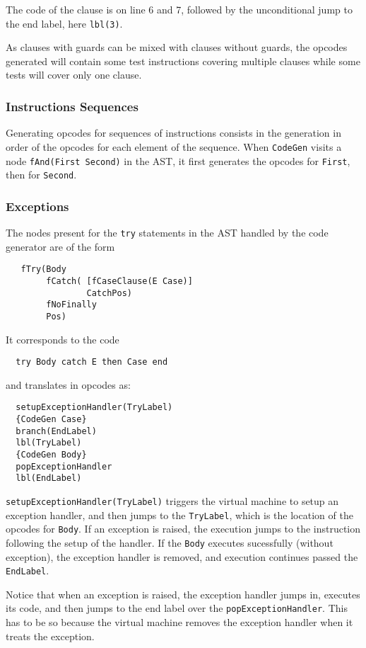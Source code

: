 \documentclass[a4paper]{memoir}
\begin{document}
The code of the clause is on line 6 and 7, followed by the unconditional jump to
the end label, here \lstinline!lbl(3)!.

As clauses with guards can be mixed with clauses without guards, the opcodes
generated will contain some test instructions covering multiple clauses while
some tests will cover only one clause.

\subsubsection{Instructions Sequences}
Generating opcodes for sequences of instructions consists in the generation in order of the opcodes for each element of the sequence. 
When \lstinline!CodeGen! visits a node \lstinline!fAnd(First Second)! in the AST, it first generates the opcodes for \lstinline!First!, then for \lstinline!Second!.


\subsubsection{Exceptions}\label{sec:arch:codegen:exceptions}
The nodes present for the \lstinline!try! statements in the AST handled by the
code generator are of the form
\begin{lstlisting}
   fTry(Body 
        fCatch( [fCaseClause(E Case)] 
                CatchPos) 
        fNoFinally 
        Pos)
\end{lstlisting}
It corresponds to the code
\begin{lstlisting}
  try Body catch E then Case end
\end{lstlisting}
and translates in opcodes as:
\begin{lstlisting}
  setupExceptionHandler(TryLabel)
  {CodeGen Case}
  branch(EndLabel)
  lbl(TryLabel)
  {CodeGen Body}
  popExceptionHandler
  lbl(EndLabel)
\end{lstlisting}

\lstinline!setupExceptionHandler(TryLabel)! triggers the virtual machine to setup an
exception handler, and then jumps to the \lstinline!TryLabel!, which is the
location of the opcodes for \lstinline!Body!. If an exception is raised, the
execution jumps to the instruction following the setup of the handler. If the
\lstinline!Body! executes sucessfully (without exception), the exception handler
is removed, and execution continues passed the \lstinline!EndLabel!.

Notice that when an exception is raised, the exception handler jumps in,
executes its code, and then jumps to the end label over the
\lstinline!popExceptionHandler!. This has to be so because the virtual
machine removes the exception handler when it treats the exception.
\end{document}
